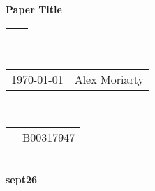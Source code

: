 \documentclass[12pt]{article}
\renewcommand{\title}[1]{\textbf{#1}\\}
\renewcommand{\line}{\begin{tabularx}{\textwidth}{X>{\raggedleft}X}\hline\\\end{tabularx}\\[-0.5cm]}
\newcommand{\leftright}[2]{\begin{tabularx}{\textwidth}{X>{\raggedleft}X}#1%
& #2\\\end{tabularx}\\[-0.5cm]}
\begin{document}
\title{Paper Title}
\line
\leftright{\today}{Alex Moriarty} %
\leftright{}{B00317947}

\textbf{sept26}
\end{document}
